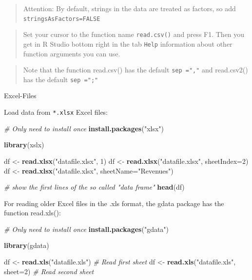 \documentclass[
]{book}
\newenvironment{Shaded}{\begin{snugshade}}{\end{snugshade}}
\newcommand{\CommentTok}[1]{\textcolor[rgb]{0.56,0.35,0.01}{\textit{#1}}}
\newcommand{\DataTypeTok}[1]{\textcolor[rgb]{0.13,0.29,0.53}{#1}}
\newcommand{\DecValTok}[1]{\textcolor[rgb]{0.00,0.00,0.81}{#1}}
\newcommand{\KeywordTok}[1]{\textcolor[rgb]{0.13,0.29,0.53}{\textbf{#1}}}
\newcommand{\NormalTok}[1]{#1}
\newcommand{\StringTok}[1]{\textcolor[rgb]{0.31,0.60,0.02}{#1}}
\let\oldShaded\Shaded
\let\endoldShaded\endShaded
\renewenvironment{Shaded}{\footnotesize\oldShaded}{\endoldShaded}
\begin{document}
\begin{quote}
Attention: By default, strings in the data are treated as factors, so add \texttt{stringsAsFactors=FALSE}
\end{quote}

\begin{quote}
Set your cursor to the function name \texttt{read.csv()} and press F1. Then you get in R Studio bottom right in the tab \texttt{Help} information about other function arguments you can use.
\end{quote}

\begin{quote}
Note that the function read.csv() has the default \texttt{sep\ =","} and read.csv2() has the default \texttt{sep\ =";"}
\end{quote}

Excel-Files

Load data from \texttt{*.xlsx} Excel files:

\begin{Shaded}
\begin{Highlighting}[]
\CommentTok{# Only need to install once}
\KeywordTok{install.packages}\NormalTok{(}\StringTok{"xlsx"}\NormalTok{)}

\KeywordTok{library}\NormalTok{(xslx)}

\NormalTok{df <-}\StringTok{ }\KeywordTok{read.xlsx}\NormalTok{(}\StringTok{"datafile.xlsx"}\NormalTok{, }\DecValTok{1}\NormalTok{)}
\NormalTok{df <-}\StringTok{ }\KeywordTok{read.xlsx}\NormalTok{(}\StringTok{"datafile.xlsx"}\NormalTok{, }\DataTypeTok{sheetIndex=}\DecValTok{2}\NormalTok{)}
\NormalTok{df <-}\StringTok{ }\KeywordTok{read.xlsx}\NormalTok{(}\StringTok{"datafile.xlsx"}\NormalTok{, }\DataTypeTok{sheetName=}\StringTok{"Revenues"}\NormalTok{)}

\CommentTok{# show the first lines of the so called "data frame"}
\KeywordTok{head}\NormalTok{(df)}
\end{Highlighting}
\end{Shaded}

For reading older Excel files in the .xls format, the gdata package has the function read.xls():

\begin{Shaded}
\begin{Highlighting}[]
\CommentTok{# Only need to install once}
\KeywordTok{install.packages}\NormalTok{(}\StringTok{"gdata"}\NormalTok{)}

\KeywordTok{library}\NormalTok{(gdata)}

\NormalTok{df <-}\StringTok{ }\KeywordTok{read.xls}\NormalTok{(}\StringTok{"datafile.xls"}\NormalTok{) }\CommentTok{# Read first sheet}
\NormalTok{df <-}\StringTok{ }\KeywordTok{read.xls}\NormalTok{(}\StringTok{"datafile.xls"}\NormalTok{, }\DataTypeTok{sheet=}\DecValTok{2}\NormalTok{) }\CommentTok{# Read second sheet}
\end{Highlighting}
\end{Shaded}
\end{document}
